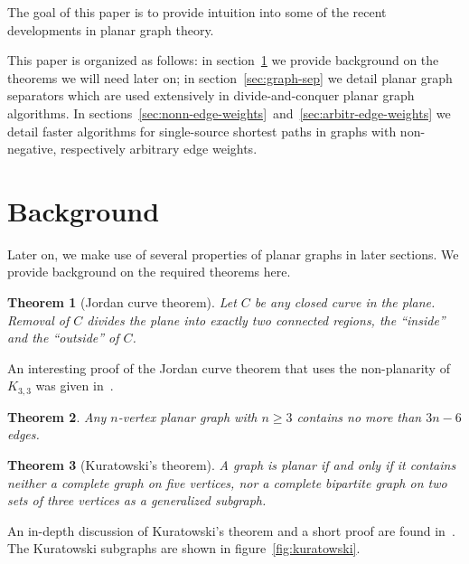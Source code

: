 \documentclass[12pt]{article}
\newtheorem{theorem}{Theorem}[section]
\begin{document}
The goal of this paper is to provide intuition into some of the recent developments in planar graph theory.

This paper is organized as follows: in section~\ref{sec:background} we provide background on the theorems we will need later on; in section~\ref{sec:graph-sep} we detail planar graph separators which are used extensively in divide-and-conquer planar graph algorithms. In sections~\ref{sec:nonn-edge-weights}~and~\ref{sec:arbitr-edge-weights} we detail faster algorithms for single-source shortest paths in graphs with non-negative, respectively arbitrary edge weights.

\section{Background}
\label{sec:background}

Later on, we make use of several properties of planar graphs in later sections. We provide background on the required theorems here.\\

\begin{theorem}[Jordan curve theorem]
  Let $C$ be any closed curve in the plane. Removal of $C$ divides the plane into exactly two connected regions, the ``inside'' and the ``outside'' of $C$.
\end{theorem}

An interesting proof of the Jordan curve theorem that uses the non-planarity of $K_{3,3}$ was given in~\cite{thomassen1992jordan}.\\

\begin{theorem}
  Any $n$-vertex planar graph with $n \geq 3$ contains no more than $3n-6$ edges.\\
\end{theorem}

\begin{theorem}[Kuratowski's theorem]
  A graph is planar if and only if it contains neither a complete graph on five vertices, nor a complete bipartite graph on two sets of three vertices as a generalized subgraph.
\end{theorem}

An in-depth discussion of Kuratowski's theorem and a short proof are found in~\cite{thomassen1981kuratowski}. The Kuratowski subgraphs are shown in figure~\ref{fig:kuratowski}.\\
\end{document}

